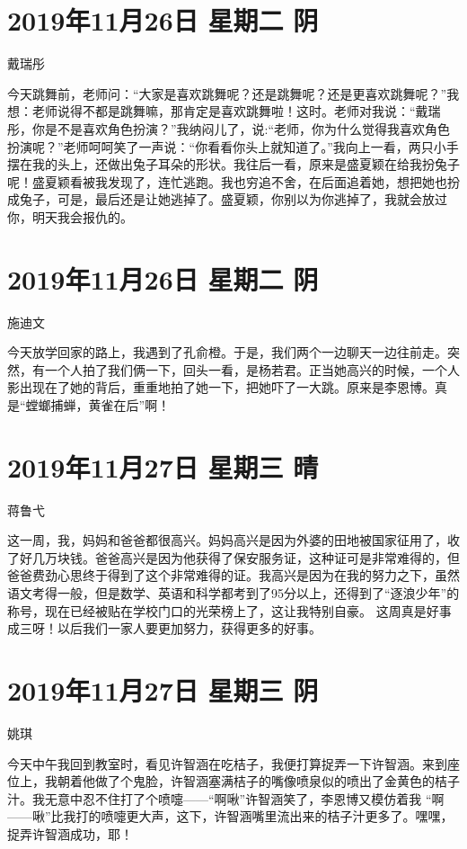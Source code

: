 \section{2019年11月26日 星期二 阴}

戴瑞彤

今天跳舞前，老师问：``大家是喜欢跳舞呢？还是跳舞呢？还是更喜欢跳舞呢？''我想：老师说得不都是跳舞嘛，那肯定是喜欢跳舞啦！这时。老师对我说：``戴瑞彤，你是不是喜欢角色扮演？''我纳闷儿了，说:``老师，你为什么觉得我喜欢角色扮演呢？''老师呵呵笑了一声说：``你看看你头上就知道了。''我向上一看，两只小手摆在我的头上，还做出兔子耳朵的形状。我往后一看，原来是盛夏颖在给我扮兔子呢！盛夏颖看被我发现了，连忙逃跑。我也穷追不舍，在后面追着她，想把她也扮成兔子，可是，最后还是让她逃掉了。盛夏颖，你别以为你逃掉了，我就会放过你，明天我会报仇的。

\section{2019年11月26日 星期二 阴}

施迪文

今天放学回家的路上，我遇到了孔俞橙。于是，我们两个一边聊天一边往前走。突然，有一个人拍了我们俩一下，回头一看，是杨若君。正当她高兴的时候，一个人影出现在了她的背后，重重地拍了她一下，把她吓了一大跳。原来是李恩博。真是``螳螂捕蝉，黄雀在后''啊！

\section{2019年11月27日 星期三 晴}

蒋鲁弋

这一周，我，妈妈和爸爸都很高兴。妈妈高兴是因为外婆的田地被国家征用了，收了好几万块钱。爸爸高兴是因为他获得了保安服务证，这种证可是非常难得的，但爸爸费劲心思终于得到了这个非常难得的证。我高兴是因为在我的努力之下，虽然语文考得一般，但是数学、英语和科学都考到了95分以上，还得到了``逐浪少年''的称号，现在已经被贴在学校门口的光荣榜上了，这让我特别自豪。
这周真是好事成三呀！以后我们一家人要更加努力，获得更多的好事。

\section{2019年11月27日 星期三 阴}

姚琪

今天中午我回到教室时，看见许智涵在吃桔子，我便打算捉弄一下许智涵。来到座位上，我朝着他做了个鬼脸，许智涵塞满桔子的嘴像喷泉似的喷出了金黄色的桔子汁。我无意中忍不住打了个喷嚏------``啊啾''许智涵笑了，李恩博又模仿着我
``啊------啾''比我打的喷嚏更大声，这下，许智涵嘴里流出来的桔子汁更多了。嘿嘿，捉弄许智涵成功，耶！

